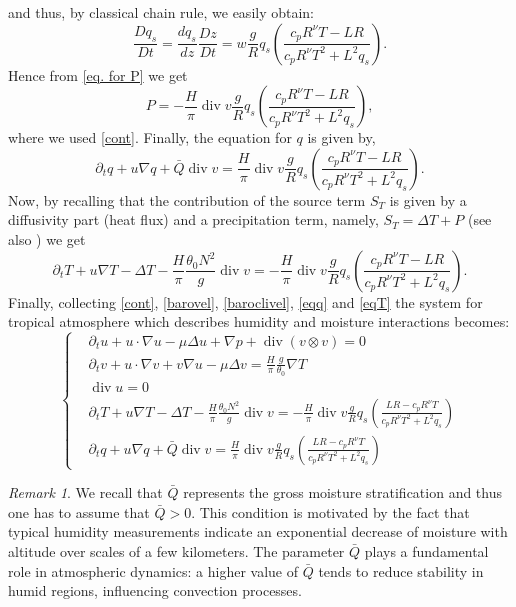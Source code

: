 \documentclass[11pt, a4paper, article,reqno,]{amsart}
\theoremstyle{remark}
\newtheorem{remark}[theorem]{Remark}
\DeclareMathOperator{\dive}{div}
\numberwithin{equation}{section}
\begin{document}
and thus, by classical chain rule, we easily obtain:
\begin{equation*}
    \frac{Dq_s}{Dt} = \frac{dq_s}{dz} \frac{Dz}{Dt} = w \frac{g}{R} q_s \left( \frac{c_p R^{\nu} T- LR}{c_p R^{\nu} T^2 + L^2 q_s} \right).
\end{equation*}
Hence from \eqref{eq. for P} we get
$$P=- \frac{H}{\pi} \dive v  \frac{g}{R} q_s \left( \frac{c_p R^{\nu} T-LR}{c_p R^{\nu} T^2 + L^2 q_s} \right), $$
where we used \eqref{cont}.
Finally, the equation for $q$ is given by, 
\begin{equation}\label{eqq}
    \partial_t q + u \nabla q + \bar{Q} \dive v = \frac{H}{\pi} \dive v  \frac{g}{R} q_s \left( \frac{c_p R^{\nu} T-LR}{c_p R^{\nu} T^2 + L^2 q_s} \right). 
\end{equation}
Now, by recalling  that the contribution of the source term $S_T$ is given by a diffusivity part (heat flux) and a precipitation term, namely, $S_T = \Delta T +  P$ (see also \cite{LT,SM}) we get
\begin{equation}\label{eqT}
    \partial_t T + u \nabla T - \Delta T -  \frac{H}{\pi}\frac{\theta_0 N^2}{g}\dive v = -\frac{H}{\pi} \dive v  \frac{g}{R} q_s \left( \frac{c_p R^{\nu} T-LR}{c_p R^{\nu} T^2 + L^2 q_s} \right).
\end{equation}
Finally, collecting \eqref{cont}, \eqref{barovel}, \eqref{baroclivel}, \eqref{eqq} and \eqref{eqT} the system for tropical atmosphere  which describes humidity and moisture  interactions becomes:
\begin{equation}\label{tro_model}
     \left\{\begin{aligned}
&\partial_t u + u \cdot \nabla u - \mu \Delta u + \nabla p + \dive (v \otimes v) = 0\\
& \partial_ t v + u \cdot \nabla v + v \nabla u - \mu \Delta v = \frac{H}{\pi} \frac{g}{\theta_0} \nabla T \\
& \dive u = 0 \\
& \partial_t T + u \nabla T - \Delta T -  \frac{H}{\pi}\frac{\theta_0 N^2}{g} \dive v = - \frac{H}{\pi} \dive v  \frac{g}{R} q_s \left( \frac{LR- c_p R^{\nu} T}{c_p R^{\nu} T^2 + L^2 q_s} \right) \\
& \partial_t q + u \nabla q + \bar{Q} \dive v = \frac{H}{\pi} \dive v  \frac{g}{R} q_s \left( \frac{LR- c_p R^{\nu} T}{c_p R^{\nu} T^2 + L^2 q_s} \right)
    \end{aligned}\right.
\end{equation}

\begin{remark}
We recall that \(\bar{Q}\) represents the gross moisture stratification and thus one has to assume that \(\bar{Q} > 0\). This condition is motivated by the fact that typical humidity measurements indicate an exponential decrease of moisture with altitude over scales of a few kilometers. The parameter \(\bar{Q}\) plays a fundamental role in atmospheric dynamics: a higher value of \(\bar{Q}\) tends to reduce stability in humid regions, influencing convection processes.
\end{remark}
\end{document}
